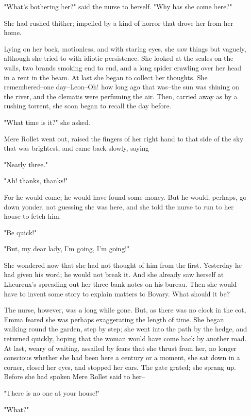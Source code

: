 \documentclass[11pt,twocolumn]{ltugboat}
\begin{document}
"What's bothering her?" said the nurse to herself. "Why has she come
here?"

She had rushed thither; impelled by a kind of horror that drove her from
her home.

Lying on her back, motionless, and with staring eyes, she saw things but
vaguely, although she tried to with idiotic persistence. She looked
at the scales on the walls, two brands smoking end to end, and a long
spider crawling over her head in a rent in the beam. At last she began
to collect her thoughts. She remembered--one day--Leon--Oh! how long
ago that was--the sun was shining on the river, and the clematis were
perfuming the air. Then, carried away as by a rushing torrent, she soon
began to recall the day before.

"What time is it?" she asked.

Mere Rollet went out, raised the fingers of her right hand to that side
of the sky that was brightest, and came back slowly, saying--

"Nearly three."

"Ah! thanks, thanks!"

For he would come; he would have found some money. But he would,
perhaps, go down yonder, not guessing she was here, and she told the
nurse to run to her house to fetch him.

"Be quick!"

"But, my dear lady, I'm going, I'm going!"

She wondered now that she had not thought of him from the first.
Yesterday he had given his word; he would not break it. And she already
saw herself at Lheureux's spreading out her three bank-notes on his
bureau. Then she would have to invent some story to explain matters to
Bovary. What should it be?

The nurse, however, was a long while gone. But, as there was no clock
in the cot, Emma feared she was perhaps exaggerating the length of time.
She began walking round the garden, step by step; she went into the path
by the hedge, and returned quickly, hoping that the woman would have
come back by another road. At last, weary of waiting, assailed by fears
that she thrust from her, no longer conscious whether she had been here
a century or a moment, she sat down in a corner, closed her eyes, and
stopped her ears. The gate grated; she sprang up. Before she had spoken
Mere Rollet said to her--

"There is no one at your house!"

"What?"
\end{document}
